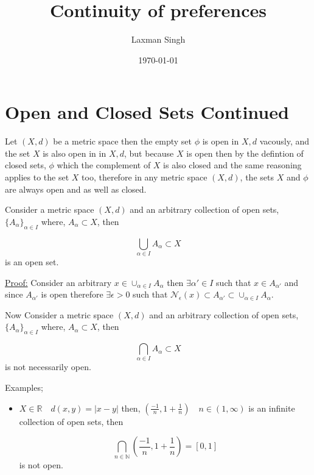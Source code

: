 \documentclass[12pt,a4paper]{article}
\author{Laxman Singh}
\date{\today}
\title{Continuity of preferences}
\begin{document}
 \section{Open and Closed Sets Continued}
  Let \(\left( X,d \right) \) be a metric space then the empty set \(\phi \) is open in \(X,d\) vacously, and the set \(X\) is also open in in \(X,d\), but because \(X\) is open then by the defintion of closed sets, \(\phi \) which the complement of \(X\) is also closed and the same reasoning applies to the set \(X\) too, therefore in any metric space \(\left( X,d \right) \), the sets \(X\) and \(\phi \) are always open and as well as closed.
  
  Consider a metric space \(\left( X,d \right) \) and an arbitrary collection of open sets, \(\{A_{\alpha}\}_{\alpha \in I}\)  where, \(A_{\alpha} \subset X\), then 
  
  \begin{equation*}
      \bigcup_{\alpha \in I} A_{\alpha} \subset X
  \end{equation*}
  is an open set.
  
  \underline{Proof:} Consider an arbitrary \( x \in \cup_{\alpha \in I} A_{\alpha}\) then \(\exists \alpha' \in I \) such that \(x \in A_{\alpha'}\) and since \(A_{\alpha'}\) is open therefore \(\exists \epsilon > 0 \) such that \(\mathcal{N}_{\epsilon}(x) \subset A_{\alpha'} \subset \cup_{\alpha \in I} A_{\alpha}\).
  
  Now  Consider a metric space \(\left( X,d \right) \) and an arbitrary collection of open sets, \(\{A_{\alpha} \}_{\alpha \in I}\)  where, \(A_{\alpha} \subset X\), then 
  
  \begin{equation*}
      \bigcap_{\alpha \in I} A_{\alpha} \subset X
  \end{equation*}
  is not necessarily open. 

  Examples; 
  \begin{itemize}
    \item \(X \in \mathbb{R} \quad d(x,y)= |x-y|\) then, \(\left( \frac{-1}{n}, 1+\frac{1}{n} \right) \quad n \in (1, \infty)\) is an infinite collection of open sets, then
    
    \begin{equation*}
        \bigcap_{n \in \mathbb{N}} \left( \frac{-1}{n}, 1+\frac{1}{n} \right) = [0,1]       
    \end{equation*} 
    is not open.   
  \end{itemize} 
\end{document}
